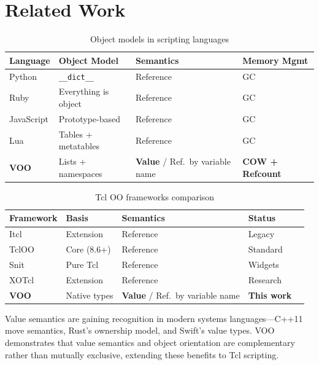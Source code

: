 \section{Related Work}

\begin{table}[H]
\centering
\caption{Object models in scripting languages}
\begin{tabular}{llll}
\toprule
\textbf{Language}   & \textbf{Object Model}            & \textbf{Semantics}                          & \textbf{Memory Mgmt} \\
\midrule
Python              & \texttt{\_\_dict\_\_}            & Reference                                   & GC \\
Ruby                & Everything is object             & Reference                                   & GC \\
JavaScript          & Prototype-based                  & Reference                                   & GC \\
Lua                 & Tables + metatables              & Reference                                   & GC \\
\textbf{VOO}        & Lists + namespaces               & \textbf{Value} / Ref.\ by variable name     & \textbf{COW + Refcount} \\
\bottomrule
\end{tabular}
\end{table}

\begin{table}[H]
\centering
\caption{Tcl OO frameworks comparison}
\begin{tabular}{lllll}
\toprule
\textbf{Framework}         & \textbf{Basis}      & \textbf{Semantics}                      & \textbf{Status} \\
\midrule
Itcl~\cite{dejong,tclwiki-itcl}  & Extension     & Reference                               & Legacy \\
TclOO~\cite{fellows2006,tcloo}   & Core (8.6+)   & Reference                               & Standard \\
Snit                              & Pure Tcl      & Reference                               & Widgets \\
XOTcl~\cite{neumann2000}          & Extension     & Reference                               & Research \\
\textbf{VOO}                      & Native types  & \textbf{Value} / Ref.\ by variable name & \textbf{This work} \\
\bottomrule
\end{tabular}
\end{table}

Value semantics are gaining recognition in modern systems languages---C++11 move
semantics, Rust's ownership model, and Swift's value types. VOO demonstrates that value
semantics and object orientation are complementary rather than mutually exclusive,
extending these benefits to Tcl scripting.
